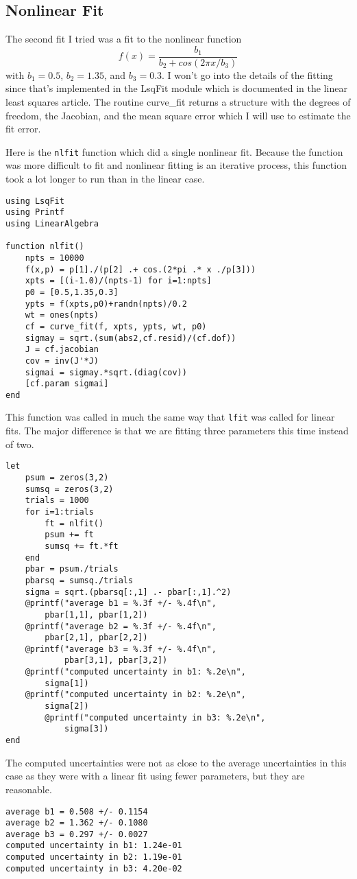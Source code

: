 \documentclass{scrartcl}
\begin{document}
\subsection{Nonlinear Fit}
The second fit I tried was a fit to the nonlinear function
\begin{equation}
f(x)= \frac{b_1}{b_2 + cos(2\pi x/b_3)}
\end{equation}
with $b_1 = 0.5$, $b_2 = 1.35$, and $b_3 = 0.3$. I won't
go into the details of the fitting since that's implemented in the
LsqFit module which is documented in the linear least squares
article\cite{linLS}. The routine curve\_fit returns a structure
with the degrees of freedom, the Jacobian, and the mean square
error which I will use to estimate the fit error.

Here is the \texttt{nlfit} function which did a single nonlinear
fit. Because the function was more difficult to fit and nonlinear
fitting is an iterative process, this function took a lot
longer to run than in the linear case.
\begin{lstlisting}
using LsqFit
using Printf
using LinearAlgebra

function nlfit()
    npts = 10000
    f(x,p) = p[1]./(p[2] .+ cos.(2*pi .* x ./p[3]))
    xpts = [(i-1.0)/(npts-1) for i=1:npts]
    p0 = [0.5,1.35,0.3]
    ypts = f(xpts,p0)+randn(npts)/0.2
    wt = ones(npts)
    cf = curve_fit(f, xpts, ypts, wt, p0)
    sigmay = sqrt.(sum(abs2,cf.resid)/(cf.dof))
    J = cf.jacobian
    cov = inv(J'*J)
    sigmai = sigmay.*sqrt.(diag(cov))
    [cf.param sigmai]
end
\end{lstlisting}
This function was called in much the same way that \texttt{lfit}
was called for linear fits. The major difference is that we are
fitting three parameters this time instead of two.
\begin{lstlisting}
let
    psum = zeros(3,2)
    sumsq = zeros(3,2)
    trials = 1000
    for i=1:trials
        ft = nlfit()
        psum += ft
        sumsq += ft.*ft
    end
    pbar = psum./trials
    pbarsq = sumsq./trials
    sigma = sqrt.(pbarsq[:,1] .- pbar[:,1].^2)
    @printf("average b1 = %.3f +/- %.4f\n",
        pbar[1,1], pbar[1,2])
    @printf("average b2 = %.3f +/- %.4f\n",
        pbar[2,1], pbar[2,2])
    @printf("average b3 = %.3f +/- %.4f\n",
            pbar[3,1], pbar[3,2])
    @printf("computed uncertainty in b1: %.2e\n",
        sigma[1])
    @printf("computed uncertainty in b2: %.2e\n",
        sigma[2])
        @printf("computed uncertainty in b3: %.2e\n",
            sigma[3])
end
\end{lstlisting}
The computed uncertainties were not as close to the
average uncertainties in this case as they were with a linear
fit using fewer parameters, but they are reasonable.
\begin{lstlisting}
average b1 = 0.508 +/- 0.1154
average b2 = 1.362 +/- 0.1080
average b3 = 0.297 +/- 0.0027
computed uncertainty in b1: 1.24e-01
computed uncertainty in b2: 1.19e-01
computed uncertainty in b3: 4.20e-02
\end{lstlisting}
\end{document}
